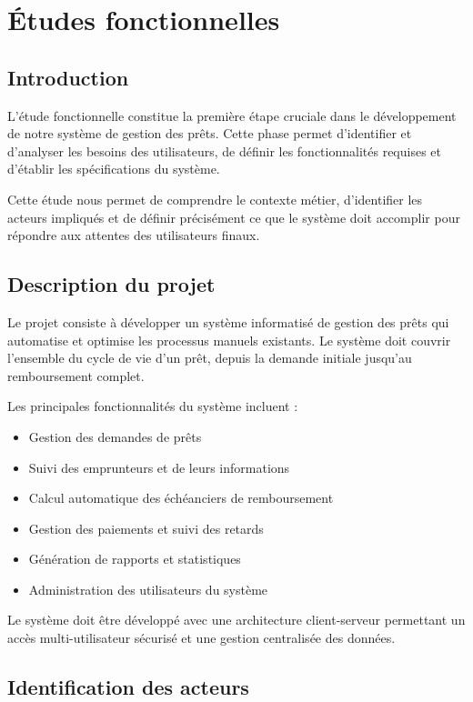 \documentclass[12pt,a4paper]{report}
\begin{document}
\chapter{Études fonctionnelles}

\section{Introduction}

L'étude fonctionnelle constitue la première étape cruciale dans le développement de notre système de gestion des prêts. Cette phase permet d'identifier et d'analyser les besoins des utilisateurs, de définir les fonctionnalités requises et d'établir les spécifications du système.

Cette étude nous permet de comprendre le contexte métier, d'identifier les acteurs impliqués et de définir précisément ce que le système doit accomplir pour répondre aux attentes des utilisateurs finaux.

\section{Description du projet}

Le projet consiste à développer un système informatisé de gestion des prêts qui automatise et optimise les processus manuels existants. Le système doit couvrir l'ensemble du cycle de vie d'un prêt, depuis la demande initiale jusqu'au remboursement complet.

Les principales fonctionnalités du système incluent :
\begin{itemize}
    \item Gestion des demandes de prêts
    \item Suivi des emprunteurs et de leurs informations
    \item Calcul automatique des échéanciers de remboursement
    \item Gestion des paiements et suivi des retards
    \item Génération de rapports et statistiques
    \item Administration des utilisateurs du système
\end{itemize}

Le système doit être développé avec une architecture client-serveur permettant un accès multi-utilisateur sécurisé et une gestion centralisée des données.

\section{Identification des acteurs}
\end{document}
